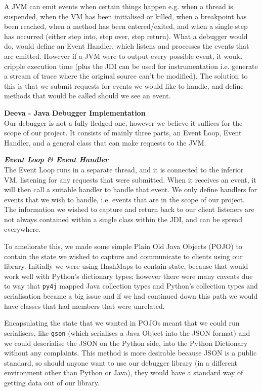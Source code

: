 \documentclass[11pt, a4paper]{article}
\begin{document}
A JVM can emit events when certain things happen e.g. when a thread is suspended, when the VM has been initialised or killed, when a breakpoint has been reached, when a method has been entered/exited, and when a single step has occurred (either step into, step over, step return).
What a debugger would do, would define an Event Handler, which listens and processes the events that are emitted.
However if a JVM were to output every possible event, it would cripple execution time (plus the JDI can be used for instrumentation i.e. generate a stream of trace where the original source can't be modified).
The solution to this is that we submit requests for events we would like to handle, and define methods that would be called should we see an event.

\textbf{Deeva - Java Debugger Implementation}\\
Our debugger is not a fully fledged one, however we believe it suffices for the scope of our project.
It consists of mainly three parts, an Event Loop, Event Handler, and a general class that can make requests to the JVM.

\textbf{\emph{Event Loop \& Event Handler}}\\
The Event Loop runs in a separate thread, and it is connected to the inferior VM, listening for any requests that were submitted.
When it receives an event, it will then call a suitable handler to handle that event.
We only define handlers for events that we wish to handle, i.e. events that are in the scope of our project.
The information we wished to capture and return back to our client listeners are not always contained within a single class within the JDI, and can be spread everywhere.

To ameliorate this, we made some simple Plain Old Java Objects (POJO) to contain the state we wished to capture and communicate to clients using our library.
Initially we were using HashMaps to contain state, because that would work well with Python's dictionary types; however there were many caveats due to way that \texttt{py4j} mapped Java collection types and Python's collection types and serialisation became a big issue and if we had continued down this path we would have classes that had members that were unrelated.

Encapsulating the state that we wanted in POJOs meant that we could run serialisers, like \texttt{gson} (which serialises a Java Object into the JSON format) and we could deserialise the JSON on the Python side, into the Python Dictionary without any complaints.
This method is more desirable because JSON is a public standard, so should anyone want to use our debugger library (in a different environment other than Python or Java), they would have a standard way of getting data out of our library.
\end{document}
